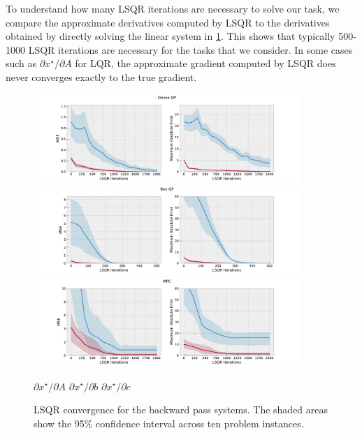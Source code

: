 To understand how many LSQR iterations are necessary
to solve our task, we compare the approximate derivatives computed
by LSQR to the derivatives obtained by directly solving
the linear system in \cref{fig:cvxpyth:lsqr_conv}.
This shows that typically 500-1000 LSQR iterations
are necessary for the tasks that we consider.
In some cases such as $\partial x^\star / \partial A$
for LQR, the approximate gradient computed by LSQR does
never converges exactly to the true gradient.

\begin{figure}[!t]
  \centering
  \includegraphics[width=0.9\textwidth]{lsqr_dense_qp.pdf}
  \includegraphics[width=0.9\textwidth]{lsqr_box_qp.pdf}
  \includegraphics[width=0.9\textwidth]{lsqr_mpc.pdf}

   $\partial x^\star/\partial A$ \enskip
   $\partial x^\star / \partial b$ \enskip
   $\partial x^\star / \partial c$
  \caption{LSQR convergence for the backward pass systems.
    The shaded areas show the 95\% confidence interval
    across ten problem instances.
  }
  \label{fig:cvxpyth:lsqr_conv}
\end{figure}

